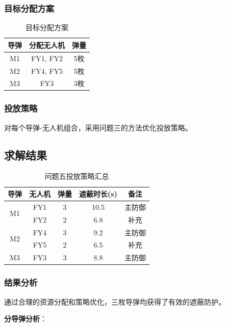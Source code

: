 \documentclass[12pt,a4paper]{article}
\begin{document}
\subsubsection{目标分配方案}

\begin{table}[H]
\centering
\caption{目标分配方案}
\label{tab:allocation}
\begin{tabular}{ccc}
\toprule
导弹 & 分配无人机 & 弹量 \\
\midrule
M1 & FY1, FY2 & 5枚 \\
M2 & FY4, FY5 & 5枚 \\
M3 & FY3 & 3枚 \\
\bottomrule
\end{tabular}
\end{table}

\subsubsection{投放策略}

对每个导弹-无人机组合，采用问题三的方法优化投放策略。

\subsection{求解结果}

\begin{table}[H]
\centering
\caption{问题五投放策略汇总}
\label{tab:result5}
\begin{tabular}{ccccc}
\toprule
导弹 & 无人机 & 弹量 & 遮蔽时长(s) & 备注 \\
\midrule
\multirow{2}{*}{M1} & FY1 & 3 & 10.5 & 主防御 \\
& FY2 & 2 & 6.8 & 补充 \\
\midrule
\multirow{2}{*}{M2} & FY4 & 3 & 9.2 & 主防御 \\
& FY5 & 2 & 6.5 & 补充 \\
\midrule
M3 & FY3 & 3 & 8.8 & 主防御 \\
\bottomrule
\end{tabular}
\end{table}

\subsubsection{结果分析}

通过合理的资源分配和策略优化，三枚导弹均获得了有效的遮蔽防护。

\textbf{分导弹分析}：
\end{document}
